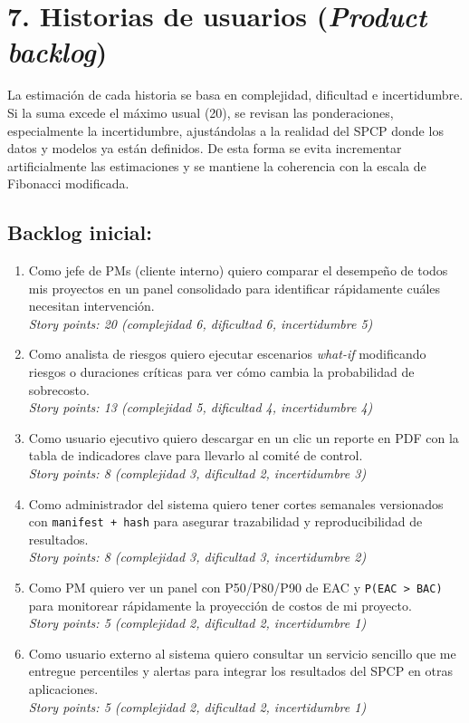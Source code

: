\documentclass[12pt]
{charter}
\begin{document}
\section{7. Historias de usuarios (\textit{Product backlog})}
\label{sec:backlog}

La estimación de cada historia se basa en complejidad, dificultad e incertidumbre.
Si la suma excede el máximo usual (20), se revisan las ponderaciones, especialmente la incertidumbre, ajustándolas a la realidad del SPCP donde los datos y modelos ya están definidos.
De esta forma se evita incrementar artificialmente las estimaciones y se mantiene la coherencia con la escala de Fibonacci modificada.

\subsection{Backlog inicial:}

  \begin{enumerate}
  \item Como jefe de PMs (cliente interno) quiero comparar el desempeño de todos mis proyectos en un panel consolidado para identificar rápidamente cuáles necesitan intervención.\\
  \textit{Story points: 20 (complejidad 6, dificultad 6, incertidumbre 5)}

  \item Como analista de riesgos quiero ejecutar escenarios \textit{what-if} modificando riesgos o duraciones críticas para ver cómo cambia la probabilidad de sobrecosto.\\
  \textit{Story points: 13 (complejidad 5, dificultad 4, incertidumbre 4)}

  \item Como usuario ejecutivo quiero descargar en un clic un reporte en PDF con la tabla de indicadores clave para llevarlo al comité de control.\\
  \textit{Story points: 8 (complejidad 3, dificultad 2, incertidumbre 3)}

  \item Como administrador del sistema quiero tener cortes semanales versionados con 
  \texttt{manifest + hash} para asegurar trazabilidad y reproducibilidad de resultados.\\
  \textit{Story points: 8 (complejidad 3, dificultad 3, incertidumbre 2)}

  \item Como PM quiero ver un panel con P50/P80/P90 de EAC y \texttt{P(EAC > BAC)} 
  para monitorear rápidamente la proyección de costos de mi proyecto.\\
  \textit{Story points: 5 (complejidad 2, dificultad 2, incertidumbre 1)}

  \item Como usuario externo al sistema quiero consultar un servicio sencillo que me entregue percentiles y alertas para integrar los resultados del SPCP en otras aplicaciones.\\
  \textit{Story points: 5 (complejidad 2, dificultad 2, incertidumbre 1)}

  \end{enumerate}
\end{document}
